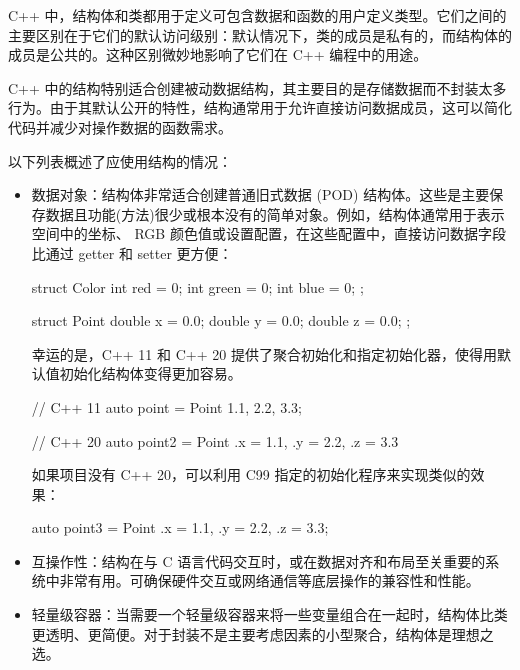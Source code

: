 
C++ 中，结构体和类都用于定义可包含数据和函数的用户定义类型。它们之间的主要区别在于它们的默认访问级别：默认情况下，类的成员是私有的，而结构体的成员是公共的。这种区别微妙地影响了它们在 C++ 编程中的用途。


C++ 中的结构特别适合创建被动数据结构，其主要目的是存储数据而不封装太多行为。由于其默认公开的特性，结构通常用于允许直接访问数据成员，这可以简化代码并减少对操作数据的函数需求。

以下列表概述了应使用结构的情况：

\begin{itemize}
\item
数据对象：结构体非常适合创建普通旧式数据 (POD) 结构体。这些是主要保存数据且功能(方法)很少或根本没有的简单对象。例如，结构体通常用于表示空间中的坐标、 RGB 颜色值或设置配置，在这些配置中，直接访问数据字段比通过 getter 和 setter 更方便：

\begin{cpp}
struct Color {
    int red = 0;
    int green = 0;
    int blue = 0;
};

struct Point {
    double x = 0.0;
    double y = 0.0;
    double z = 0.0;
};
\end{cpp}

幸运的是，C++ 11 和 C++ 20 提供了聚合初始化和指定初始化器，使得用默认值初始化结构体变得更加容易。

\begin{cpp}
// C++ 11
auto point = Point {1.1, 2.2, 3.3};

// C++ 20
auto point2 = Point {.x = 1.1, .y = 2.2, .z = 3.3}
\end{cpp}

如果项目没有 C++ 20，可以利用 C99 指定的初始化程序来实现类似的效果：

\begin{cpp}
    auto point3 = Point {.x = 1.1, .y = 2.2, .z = 3.3};
\end{cpp}

\item
互操作性：结构在与 C 语言代码交互时，或在数据对齐和布局至关重要的系统中非常有用。可确保硬件交互或网络通信等底层操作的兼容性和性能。

\item
轻量级容器：当需要一个轻量级容器来将一些变量组合在一起时，结构体比类更透明、更简便。对于封装不是主要考虑因素的小型聚合，结构体是理想之选。
\end{itemize}

